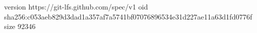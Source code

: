 version https://git-lfs.github.com/spec/v1
oid sha256:c053aeb829d3dad1a357af7a5741bf07076896534e31d227ae11a63d1fd0776f
size 92346
